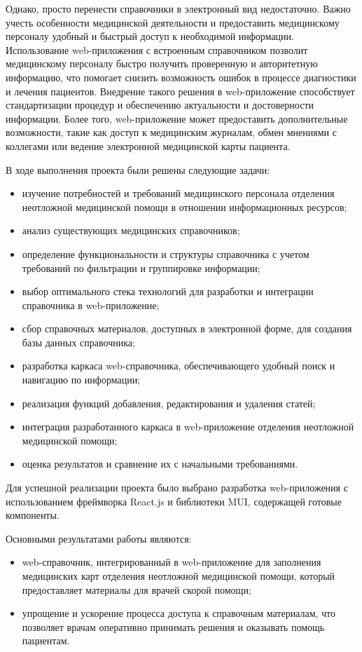 Однако, просто перенести справочники в электронный вид недостаточно. Важно учесть особенности медицинской деятельности и предоставить медицинскому персоналу удобный и быстрый доступ к необходимой информации. Использование web-приложения с встроенным справочником позволит медицинскому персоналу быстро получить проверенную и авторитетную информацию, что помогает снизить возможность ошибок в процессе диагностики и лечения пациентов. Внедрение такого решения в web-приложение способствует стандартизации процедур и обеспечению актуальности и достоверности информации. Более того, web-приложение может предоставить дополнительные возможности, такие как доступ к медицинским журналам, обмен мнениями с коллегами или ведение электронной медицинской карты пациента.

В ходе выполнения проекта были решены следующие задачи:
\begin{itemize}
    \item изучение потребностей и требований медицинского персонала отделения неотложной медицинской помощи в отношении информационных ресурсов;
    \item анализ существующих медицинских справочников;
    \item определение функциональности и структуры справочника с учетом требований по фильтрации и группировке информации;
    \item выбор оптимального стека технологий для разработки и интеграции справочника в web-приложение;
    \item сбор справочных материалов, доступных в электронной форме, для создания базы данных справочника;
    \item разработка каркаса web-справочника, обеспечивающего удобный поиск и навигацию по информации;
    \item реализация функций добавления, редактирования и удаления статей;
    \item интеграция разработанного каркаса в web-приложение отделения неотложной медицинской помощи;
    \item оценка результатов и сравнение их с начальными требованиями.
\end{itemize}

Для успешной реализации проекта было выбрано разработка web-приложения с использованием фреймворка React.js и библиотеки MUI, содержащей готовые компоненты.

Основными результатами работы являются:
\begin{itemize}
    \item web-справочник, интегрированный в web-приложение для заполнения медицинских карт отделения неотложной медицинской помощи, который предоставляет материалы для врачей скорой помощи;
    \item упрощение и ускорение процесса доступа к справочным материалам, что позволяет врачам оперативно принимать решения и оказывать помощь пациентам.
\end{itemize}

